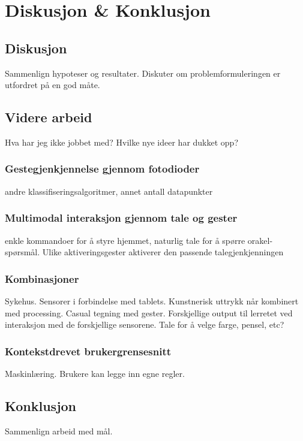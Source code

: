 \section[Diskusjon \& Konklusjon]{Diskusjon \& Konklusjon}
\subsection{Diskusjon}
{\color{red}Sammenlign hypoteser og resultater. Diskuter om problemformuleringen er utfordret på en god måte.}

\subsection{Videre arbeid}
{\color{red}Hva har jeg ikke jobbet med? Hvilke nye ideer har dukket opp?}

\subsubsection*{Gestegjenkjennelse gjennom fotodioder}
andre klassifiseringsalgoritmer, annet antall datapunkter

\subsubsection*{Multimodal interaksjon gjennom tale og gester}
enkle kommandoer for å styre hjemmet, naturlig tale for å spørre orakel-spørsmål. Ulike aktiveringsgester aktiverer den passende talegjenkjenningen

\subsubsection*{Kombinasjoner}
Sykehus.
Sensorer i forbindelse med tablets.
Kunstnerisk uttrykk når  kombinert med processing. Casual tegning med gester. Forskjellige output til lerretet ved interaksjon med de forskjellige sensorene. Tale for å velge farge, pensel, etc?

\subsubsection*{Kontekstdrevet brukergrensesnitt}
Maskinlæring.
Brukere kan legge inn egne regler.


\subsection{Konklusjon}
{\color{red}Sammenlign arbeid med mål.}